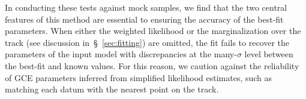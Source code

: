 \documentclass[foo.tex]{subfiles}
\begin{document}
\par
In conducting these tests against mock samples, we find that the two central
features of this method are essential to ensuring the accuracy of the best-fit
parameters.
When either the weighted likelihood or the marginalization over the track
(see discussion in~\S~\ref{sec:fitting}) are omitted, the fit fails to recover
the parameters of the input model with discrepancies at the many-$\sigma$ level
between the best-fit and known values.
For this reason, we caution against the reliability of GCE parameters inferred
from simplified likelihood estimates, such as matching each datum with the
nearest point on the track.


\end{document}
